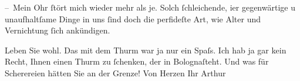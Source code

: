 \pstart
           – Mein Ohr ſtört mich wieder mehr als je. Solch ſchleichende, {\pb}i{\geminationm}er gegenwärtige u unaufhaltſame Dinge in uns ſind doch
               die perfideſte Art, wie Alter und Vernichtung ſich ankündigen.\pend
           
\pstart
           Leben Sie wohl. Das mit dem Thurm war ja nur
               ein Spaſs. Ich hab ja gar kein Recht, Ihnen einen Thurm zu ſchenken, der in Bolognaſteht. Und was für Scherereien hätten Sie an der
               Grenze!\pend
           \pstart Von Herzen Ihr \spacefill\mbox{Arthur}\pend{}\endnumbering{}  
      